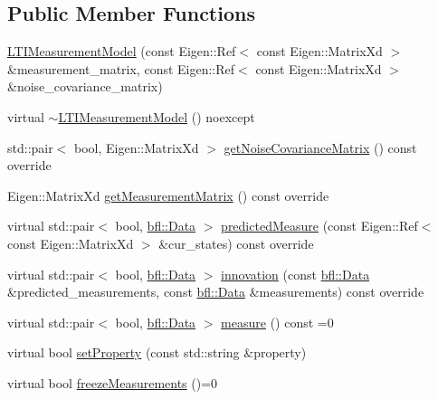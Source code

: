 \subsection*{Public Member Functions}
\begin{DoxyCompactItemize}
\item 
\mbox{\hyperlink{classbfl_1_1LTIMeasurementModel_a3d308f4b8ea9591b9f927fcd2bd3c0e7}{L\+T\+I\+Measurement\+Model}} (const Eigen\+::\+Ref$<$ const Eigen\+::\+Matrix\+Xd $>$ \&measurement\+\_\+matrix, const Eigen\+::\+Ref$<$ const Eigen\+::\+Matrix\+Xd $>$ \&noise\+\_\+covariance\+\_\+matrix)
\item 
virtual \mbox{\hyperlink{classbfl_1_1LTIMeasurementModel_ac5a6fdda50dd6cd062f5caa455a70138}{$\sim$\+L\+T\+I\+Measurement\+Model}} () noexcept
\item 
std\+::pair$<$ bool, Eigen\+::\+Matrix\+Xd $>$ \mbox{\hyperlink{classbfl_1_1LTIMeasurementModel_a227ed150a9fdcb2b5b59f7b71eb7e462}{get\+Noise\+Covariance\+Matrix}} () const override
\item 
Eigen\+::\+Matrix\+Xd \mbox{\hyperlink{classbfl_1_1LTIMeasurementModel_a2eb547472621fd60e461ae40665daabf}{get\+Measurement\+Matrix}} () const override
\item 
virtual std\+::pair$<$ bool, \mbox{\hyperlink{namespacebfl_af6b103c6821db1b54452f776fdd9dd02}{bfl\+::\+Data}} $>$ \mbox{\hyperlink{classbfl_1_1LinearMeasurementModel_a8831b8acb4790db4c69db73200375c69}{predicted\+Measure}} (const Eigen\+::\+Ref$<$ const Eigen\+::\+Matrix\+Xd $>$ \&cur\+\_\+states) const override
\item 
virtual std\+::pair$<$ bool, \mbox{\hyperlink{namespacebfl_af6b103c6821db1b54452f776fdd9dd02}{bfl\+::\+Data}} $>$ \mbox{\hyperlink{classbfl_1_1LinearMeasurementModel_a12485b4b6d511e97e338a4db6861b277}{innovation}} (const \mbox{\hyperlink{namespacebfl_af6b103c6821db1b54452f776fdd9dd02}{bfl\+::\+Data}} \&predicted\+\_\+measurements, const \mbox{\hyperlink{namespacebfl_af6b103c6821db1b54452f776fdd9dd02}{bfl\+::\+Data}} \&measurements) const override
\item 
virtual std\+::pair$<$ bool, \mbox{\hyperlink{namespacebfl_af6b103c6821db1b54452f776fdd9dd02}{bfl\+::\+Data}} $>$ \mbox{\hyperlink{classbfl_1_1MeasurementModel_ad372b720cef4e6bc0ac2489f4098bfc9}{measure}} () const =0
\item 
virtual bool \mbox{\hyperlink{classbfl_1_1MeasurementModel_af97e18b52d1a3f365dd5982b8cc4aff7}{set\+Property}} (const std\+::string \&property)
\item 
virtual bool \mbox{\hyperlink{classbfl_1_1MeasurementModel_a67ef096c5b3682252582aec75498089d}{freeze\+Measurements}} ()=0

\end{DoxyCompactItemize}
